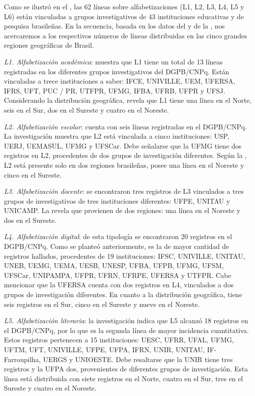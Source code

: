 \documentclass[spanish]{textolivre}
\begin{document}
Como se ilustró en el , las 62 líneas sobre alfabetizaciones (L1, L2, L3, L4, L5 y L6) están vinculadas a grupos investigativos de 43 instituciones educativas y de pesquisa brasileñas. En la secuencia, basada en los datos del  y de la , nos acercaremos a los respectivos números de líneas distribuidas en las cinco grandes regiones geográficas de Brasil.

\textit{L1. Alfabetización académica}:  muestra que L1 tiene un total de 13 líneas registradas en los diferentes grupos investigativos del DGPB/CNPq. Están vinculadas a trece instituciones a saber: IFCE, UNIVILLE, UEM, UFERSA, IFRS, UFT, PUC / PR, UTFPR, UFMG, IFBA, UFRB, UFPR y UFSJ. Considerando la distribución geográfica,  revela que L1 tiene una línea en el Norte, seis en el Sur, dos en el Sureste y cuatro en el Noreste.

\textit{L2. Alfabetización escolar}: cuenta con seis líneas registradas en el DGPB/CNPq. La investigación muestra que L2 está vinculada a cinco instituciones: USP, UERJ, UEMASUL, UFMG y UFSCar. Debe señalarse que la UFMG tiene dos registros en L2, procedentes de dos grupos de investigación diferentes. Según la , L2 está presente solo en dos regiones brasileñas, posee una línea en el Noreste y cinco en el Sureste. 

\textit{L3. Alfabetización docente}: se encontraron tres registros de L3 vinculados a tres grupos de investigativos de tres instituciones diferentes: UFPE, UNITAU y UNICAMP. La  revela que provienen de dos regiones: una línea en el Noreste y dos en el Sureste.

\textit{L4. Alfabetización digital}: de esta tipología se encontraron 20 registros en el DGPB/CNPq. Como se planteó anteriormente, es la de mayor cantidad de registros hallados, procedentes de 19 instituciones: IFSC, UNIVILLE, UNITAU, UNEB, UEMG, UEMA, UESB, UNESP, UFBA, UFPB, UFMG, UFSM, UFSCar, UNIPAMPA, UFPR, UFRN, UFRPE, UFERSA y UTFPR. Cabe mencionar que la UFERSA cuenta con dos registros en L4, vinculados a dos grupos de investigación diferentes. En cuanto a la distribución geográfica, tiene seis registros en el Sur, cinco en el Sureste y nueve en el Noreste.

\textit{L5. Alfabetización literaria}: la investigación indica que L5 alcanzó 18 registros en el DGPB/CNPq, por lo que es la segunda línea de mayor incidencia cuantitativa. Estos registros pertenecen a 15 instituciones: UESC, UFRR, UFAL, UFMG, UFTM, UFT, UNIVILLE, UFPE, UFPA, IFRN, UNIR, UNITAU, IF-Farroupilha, UERGS y UNIOESTE. Debe resaltarse que la UNIR tiene tres registros y la UFPA dos, provenientes de diferentes grupos de investigación.  Esta línea está distribuida con siete registros en el Norte, cuatro en el Sur, tres en el Sureste y cuatro en el Noreste. 
\end{document}
